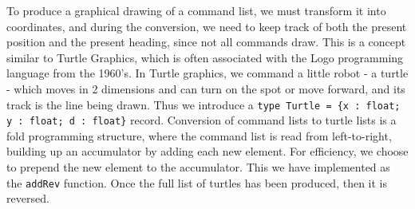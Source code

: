 \documentclass[fsharpnotes.tex]{subfiles}
\begin{document}
To produce a graphical drawing of a command list, we must transform it into coordinates, and during the conversion, we need to keep track of both the present position and the present heading, since not all commands draw. This is a concept similar to Turtle Graphics, which is often associated with the Logo programming language from the 1960's. In Turtle graphics, we command a little robot - a turtle - which moves in 2 dimensions and can turn on the spot or move forward, and its track is the line being drawn. Thus we introduce a \lstinline!type Turtle = {x : float; y : float; d : float}! record. Conversion of command lists to turtle lists is a fold programming structure, where the command list is read from left-to-right, building up an accumulator by adding each new element. For efficiency, we choose to prepend the new element to the accumulator. This we have implemented as the \lstinline{addRev} function. Once the full list of turtles has been produced, then it is reversed.
\end{document}
